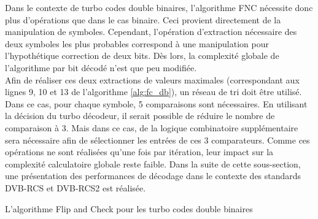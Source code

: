 Dans le contexte de turbo codes double binaires, l'algorithme FNC nécessite donc plus d'opérations que dans le cas binaire.
Ceci provient directement de la manipulation de symboles. Cependant, l'opération d'extraction nécessaire des deux symboles 
les plus probables correspond à une manipulation pour l'hypothétique correction de deux bits. Dès lors, la complexité globale
de l'algorithme par bit décodé n'est que peu modifiée.\\
Afin de réaliser ces deux extractions de valeurs maximales (correspondant aux lignes 9, 10 et 13 de l'algorithme 
\ref{alg:fc_db}), un réseau de tri doit être utilisé. Dans ce cas, pour chaque symbole, 5 comparaisons sont nécessaires.
En utilisant la décision du turbo décodeur, il serait possible de réduire le nombre de comparaison à 3. Mais dans ce cas,
de la logique combinatoire supplémentaire sera nécessaire afin de sélectionner les entrées de ces 3 comparateurs. Comme ces opérations
ne sont réalisées qu'une fois par itération, leur impact sur la complexité calculatoire globale reste faible. Dans la suite de 
cette sous-section, une présentation
des performances de décodage dans le contexte des standards DVB-RCS et DVB-RCS2 est réalisée.
\begin{center}
\begin{minipage}{.95\textwidth}%
\begin{algorithm}[H]
\label{alg:fc_db}
	\DontPrintSemicolon
	
	\;
	\caption{L'algorithme Flip and Check pour les turbo codes double binaires}
\end{algorithm}
\end{minipage}
\end{center}


